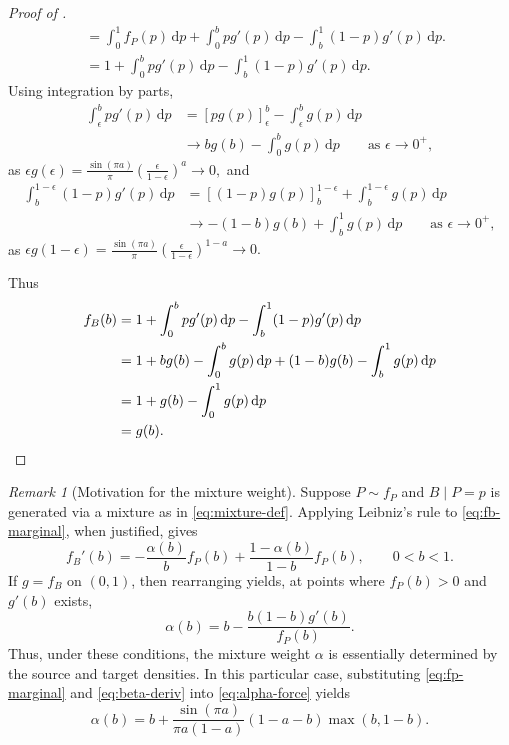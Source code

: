 \documentclass[11pt]{article}
\theoremstyle{plain}
\theoremstyle{remark}
\newtheorem{remark}[theorem]{Remark}
\begin{document}
\begin{proof}[Proof of ]
\[\begin{aligned}
&= \int_0^1 f_P(p)\,\mathrm{d}p + \int_0^b pg'(p)\,\mathrm{d}p -  \int_b^1 (1-p)g'(p)\,\mathrm{d}p.\\
&=  1 + \int_0^b pg'(p)\,\mathrm{d}p -  \int_b^1 (1-p)g'(p)\,\mathrm{d}p.
\end{aligned}
\]
Using integration by parts,
\[
\begin{aligned}
\int_\epsilon^b pg'(p)\,\mathrm{d}p &= [pg(p)]_\epsilon^b -\int_\epsilon^b g(p)\,\mathrm{d}p\\
&\rightarrow bg(b)-\int_0^bg(p)\,\mathrm{d}p\qquad\text{as }\epsilon\rightarrow 0^+,
\end{aligned}
\]
as $\epsilon g(\epsilon)=\frac{\sin(\pi a)}{\pi}\left(\frac{\epsilon}{1-\epsilon}\right)^a\rightarrow 0,$ and
\[
\begin{aligned}
\int_b^{1-\epsilon} (1-p)g'(p)\,\mathrm{d}p &= [(1-p)g(p)]_b^{1-\epsilon} +\int_b^{1-\epsilon} g(p)\,\mathrm{d}p\\
&\rightarrow -(1-b)g(b)+\int_b^1 g(p)\,\mathrm{d}p\qquad\text{as }\epsilon\rightarrow 0^+,
\end{aligned}
\]
as $\epsilon g(1-\epsilon)=\frac{\sin(\pi a)}{\pi}\left(\frac{\epsilon}{1-\epsilon}\right)^{1-a}\rightarrow 0.$

Thus
\begin{align*}
f_B(b) &=  1 + \int_0^b pg'(p)\,\mathrm{d}p -  \int_b^1 (1-p)g'(p)\,\mathrm{d}p\\
&= 1 + bg(b)-\int_0^bg(p)\,\mathrm{d}p + (1-b)g(b)-\int_b^1g(p)\,\mathrm{d}p\\
&= 1 + g(b)-\int_0^1g(p)\,\mathrm{d}p\\
&= g(b). \qedhere
\end{align*}
\end{proof}
\begin{remark}[Motivation for the mixture weight]
Suppose $P\sim f_P$ and $B\mid P=p$ is generated via a mixture as in \eqref{eq:mixture-def}.
Applying Leibniz's rule to \eqref{eq:fb-marginal}, when justified, gives
\[
f_B'(b)= -\frac{\alpha(b)}{b}f_P(b)
+ \frac{1-\alpha(b)}{1-b}f_P(b),
\qquad 0<b<1.
\]
If $g = f_B$ on $(0,1)$, then rearranging yields, at points where $f_P(b)>0$ and $g'(b)$ exists,
\begin{equation}
\alpha(b)= b - \frac{b(1-b)g'(b)}{f_P(b)}.
\label{eq:alpha-force}
\end{equation}
Thus, under these conditions, the mixture weight $\alpha$ is essentially determined by the source and target densities.
In this particular case, substituting \eqref{eq:fp-marginal} and \eqref{eq:beta-deriv} into \eqref{eq:alpha-force} yields 
\[
\alpha(b)
= b + \frac{\sin(\pi a)}{\pi a(1-a)}(1-a-b)\max(b,1-b).
\]
\end{remark}
\end{document}
